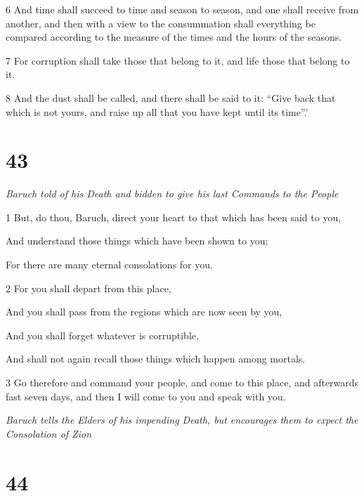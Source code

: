 \par 6 And time shall succeed to time and season to season, and one shall receive from another, and then with a view to the consummation shall everything be compared according to the measure of the times and the hours of the seasons. 

\par 7 For corruption shall take those that belong to it, and life those that belong to it. 

\par 8 And the dust shall be called, and there shall be said to it: “Give back that which is not yours, and raise up all that you have kept until its time”.’


\chapter{43}

\par \textit{Baruch told of his Death and bidden to give his last Commands to the People}

\par 1 But, do thou, Baruch, direct your heart to that which has been said to you,

\par And understand those things which have been shown to you;

\par For there are many eternal consolations for you.

\par 2 For you shall depart from this place,

\par And you shall pass from the regions which are now seen by you,

\par And you shall forget whatever is corruptible,

\par And shall not again recall those things which happen among mortals.

\par 3 Go therefore and command your people, and come to this place, and afterwards fast seven days, and then I will come to you and speak with you.

\par \textit{Baruch tells the Elders of his impending Death, but encourages them to expect the Consolation of Zion}

\chapter{44}

